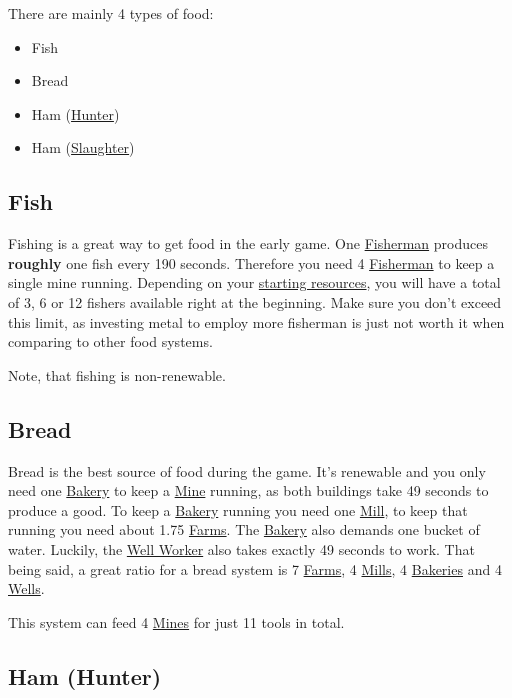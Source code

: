 \documentclass[12pt]{article}
\begin{document}
There are mainly 4 types of food:

\begin{itemize}
  \item Fish
  \item Bread
  \item Ham (\hyperref[sec:hunter]{Hunter})
  \item Ham (\hyperref[sec:slaughterhouse]{Slaughter})
\end{itemize}

\subsection{Fish}
\label{sec:fish}

Fishing is a great way to get food in the early game. One \hyperref[sec:fisherman]{Fisherman} produces \textbf{roughly} one fish every 190 seconds. Therefore you need 4 \hyperref[sec:fisherman]{Fisherman} to keep a single mine running. Depending on your \hyperref[sec:startresources]{starting resources}, you will have a total of 3, 6 or 12 fishers available right at the beginning. Make sure you don't exceed this limit, as investing metal to employ more fisherman is just not worth it when comparing to other food systems.

Note, that fishing is non-renewable.

\subsection{Bread}
\label{sec:bread}

Bread is the best source of food during the game. It's renewable and you only need one \hyperref[sec:bakery]{Bakery} to keep a \hyperref[sec:mine]{Mine} running, as both buildings take 49 seconds to produce a good. To keep a \hyperref[sec:bakery]{Bakery} running you need one \hyperref[sec:mill]{Mill}, to keep that running you need about 1.75 \hyperref[sec:farm]{Farms}. The \hyperref[sec:bakery]{Bakery} also demands one bucket of water. Luckily, the \hyperref[sec:well]{Well Worker} also takes exactly 49 seconds to work. That being said, a great ratio for a bread system is 7 \hyperref[sec:farm]{Farms}, 4 \hyperref[sec:mill]{Mills}, 4 \hyperref[sec:bakery]{Bakeries} and 4 \hyperref[sec:well]{Wells}.

This system can feed 4 \hyperref[sec:mine]{Mines} for just 11 tools in total.

\subsection{Ham (Hunter)}
\label{sec:hamhunter}
\end{document}
